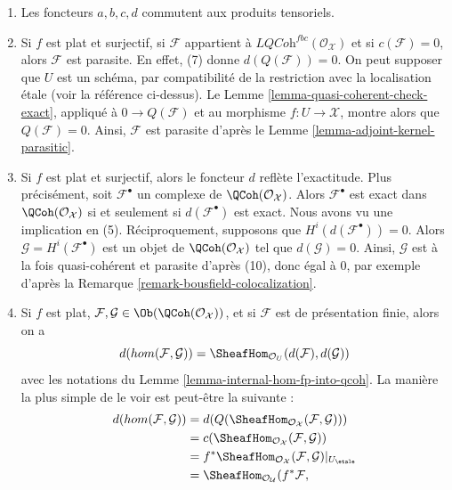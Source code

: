 \begin{enumerate}
et aux sommes directes arbitraires. Cela vaut pour $f^*$ et la restriction,
qui sont des adjoints à gauche, et vaut donc pour $a$. Le résultat pour
$b$, $c$, $d$ découle alors des références données ci-dessus.
\item Les foncteurs $a, b, c, d$ commutent aux produits tensoriels.
\item Si $f$ est plat et surjectif, si $\mathcal{F}$ appartient à
$\textit{LQCoh}^{fbc}(\mathcal{O}_\mathcal{X})$ et si $c(\mathcal{F}) = 0$,
alors $\mathcal{F}$ est parasite. En effet, (7) donne $d(Q(\mathcal{F})) = 0$.
On peut supposer que $U$ est un schéma, par compatibilité de la restriction
avec la localisation étale (voir la référence ci-dessus). Le
Lemme \ref{lemma-quasi-coherent-check-exact}, appliqué à $0 \to Q(\mathcal{F})$
et au morphisme $f : U \to \mathcal{X}$, montre alors que $Q(\mathcal{F}) = 0$.
Ainsi, $\mathcal{F}$ est parasite d'après le Lemme \ref{lemma-adjoint-kernel-parasitic}.
\item Si $f$ est plat et surjectif, alors le foncteur $d$
reflète l'exactitude. Plus précisément, soit $\mathcal{F}^\bullet$ un complexe de
$\QCoh(\mathcal{O}_\mathcal{X})$. Alors $\mathcal{F}^\bullet$ est exact
dans $\QCoh(\mathcal{O}_\mathcal{X})$ si et seulement si $d(\mathcal{F}^\bullet)$
est exact. Nous avons vu une implication en (5). Réciproquement,
supposons que $H^i(d(\mathcal{F}^\bullet)) = 0$. Alors
$\mathcal{G} = H^i(\mathcal{F}^\bullet)$ est un objet de
$\QCoh(\mathcal{O}_\mathcal{X})$ tel que $d(\mathcal{G}) = 0$.
Ainsi, $\mathcal{G}$ est à la fois quasi-cohérent et parasite d'après (10),
donc égal à $0$, par exemple d'après la Remarque \ref{remark-bousfield-colocalization}.
\item
\label{item-hom-restriction}
Si $f$ est plat,
$\mathcal{F}, \mathcal{G} \in \Ob(\QCoh(\mathcal{O}_\mathcal{X}))$,
et si $\mathcal{F}$ est de présentation finie,
alors on a
$$
d(hom(\mathcal{F}, \mathcal{G})) =
\SheafHom_{\mathcal{O}_U}(d(\mathcal{F}), d(\mathcal{G}))
$$
avec les notations du Lemme \ref{lemma-internal-hom-fp-into-qcoh}.
La manière la plus simple de le voir est peut-être la suivante :
\begin{align*}
d(hom(\mathcal{F}, \mathcal{G}))
& =
d(Q(\SheafHom_{\mathcal{O}_\mathcal{X}}(\mathcal{F}, \mathcal{G}))) \\
& =
c(\SheafHom_{\mathcal{O}_\mathcal{X}}(\mathcal{F}, \mathcal{G})) \\
& =
f^*\SheafHom_{\mathcal{O}_\mathcal{X}}(\mathcal{F}, \mathcal{G})|_{U_\etale} \\
& =
\SheafHom_{\mathcal{O}_\mathcal{U}}(f^*\mathcal{F},

\end{align*}
\end{enumerate}
